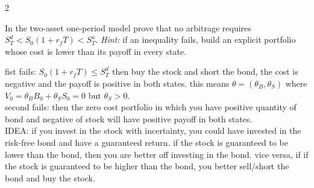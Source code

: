 \begin{paracol}{2}
\begin{exercise}\label{ex:ps1-5}
In the two-asset one-period model prove that no arbitrage requires
$S_T^d<S_0(1+r_fT)<S_T^u$. \emph{Hint:} if an inequality fails, build an explicit portfolio whose cost is
lower than its payoff in every state.
\end{exercise}
\begin{mysolution}
  fist fails: $S_0(1+r_fT)\le S_T^d$ then buy the stock and short the bond, the cost is negative and the payoff is positive in both states. this means $\theta = (\theta_B, \theta_S)$ where $V_0 = \theta_B B_0 + \theta_S S_0 = 0$ but $\theta_S > 0$.  \\
  second fails: then the zero cost portfolio in which you have positive quantity of bond and negative of stock will have positive payoff in both states. \\
  IDEA: if you invest in the stock with incertainty, you could have invested in the risk-free bond and have a guaranteed return. if the stock is guaranteed to be lower than the bond, then you are better off investing in the bond. vice versa, if if the stock is guaranteed to be higher than the bond, you better sell/short the bond and buy the stock.\\
\end{mysolution} 


\end{paracol}
